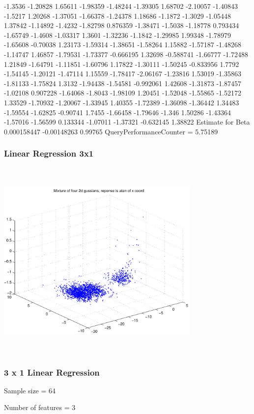 \documentclass[9pt]{article}
\theoremstyle{plain}
\theoremstyle{definition}
\theoremstyle{remark}
\numberwithin{equation}{section}
\begin{document}
-1.3536
-1.20828
1.65611
-1.98359
-1.48244
-1.39305
1.68702
-2.10057
-1.40843
-1.5217
1.20268
-1.37051
-1.66378
-1.24378
1.18686
-1.1872
-1.3029
-1.05448
1.37842
-1.14892
-1.4232
-1.82798
0.876359
-1.38471
-1.5038
-1.18778
0.793434
-1.65749
-1.4608
-1.03317
1.3601
-1.32236
-1.1842
-1.29985
1.99348
-1.78979
-1.65608
-0.70038
1.23173
-1.59314
-1.38651
-1.58264
1.15882
-1.57187
-1.48268
-1.14747
1.46857
-1.79531
-1.73377
-0.666195
1.32698
-0.588741
-1.66777
-1.72488
1.21849
-1.64791
-1.11851
-1.60796
1.17822
-1.30111
-1.50245
-0.833956
1.7792
-1.54145
-1.20121
-1.47114
1.15559
-1.78417
-2.06167
-1.23816
1.53019
-1.35863
-1.81133
-1.75824
1.3132
-1.94438
-1.54581
-0.992061
1.42608
-1.31873
-1.87457
-1.02108
0.907228
-1.64068
-1.8043
-1.98109
1.20451
-1.52048
-1.55865
-1.52172
1.33529
-1.70932
-1.20067
-1.33945
1.40355
-1.72389
-1.36098
-1.36442
1.34483
-1.59554
-1.62825
-0.90741
1.7455
-1.66458
-1.79646
-1.346
1.50286
-1.43364
-1.57016
-1.56599
0.133344
-1.07011
-1.37321
-0.632145
1.38822
Estimate for Beta
0.000158447
-0.00148263
0.99765
QueryPerformanceCounter  =  5.75189
\subsubsection{Linear Regression 3x1}
\includegraphics[width=10.0cm,height=10.0cm]{AtanDataSet.pdf}

\subsubsection{3 x 1 Linear Regression}
Sample size = 64

Number of features = 3
\end{document}
